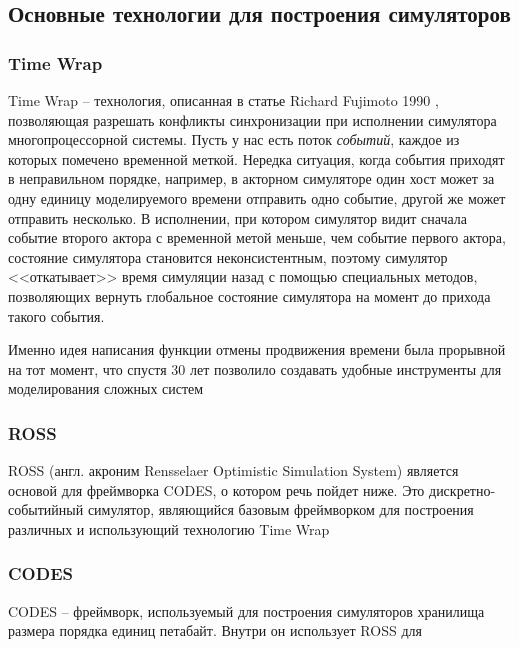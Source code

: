 \documentclass[../diploma.tex]{subfile}
\begin{document}
    \subsection{Основные технологии для построения симуляторов}
    \label{sec:review:subsec:simulation_technologies}

    \subsubsection{Time Wrap}
    
    Time Wrap -- технология, описанная в статье Richard Fujimoto
    1990 \cite{fujimoto_parallel_1990}, позволяющая разрешать конфликты синхронизации
    при исполнении симулятора многопроцессорной системы. Пусть у нас есть поток
    {\it событий}, каждое из которых помечено временной меткой. Нередка
    ситуация, когда события приходят в неправильном порядке, например, в
    акторном симуляторе один хост может за одну единицу моделируемого времени
    отправить одно событие, другой же может отправить несколько. В исполнении,
    при котором симулятор видит сначала событие второго актора с временной метой
    меньше, чем событие первого актора, состояние симулятора становится
    неконсистентным, поэтому симулятор <<откатывает>> время симуляции назад с
    помощью специальных методов, позволяющих вернуть глобальное состояние
    симулятора на момент до прихода такого события.

    Именно идея написания функции отмены продвижения времени была прорывной на
    тот момент, что спустя 30 лет позволило создавать удобные инструменты для
    моделирования сложных систем

    \subsubsection{ROSS}

    ROSS (англ. акроним Rensselaer Optimistic Simulation System) \cite{ross}
    является основой для фреймворка CODES, о котором речь пойдет ниже. Это
    дискретно-событийный симулятор, являющийся базовым фреймворком для
    построения различных и использующий технологию Time Wrap


    \subsubsection{CODES}

    CODES \cite{codes} -- фреймворк, используемый для построения симуляторов
    хранилища размера порядка единиц петабайт. Внутри он использует ROSS для 
    
\end{document}
